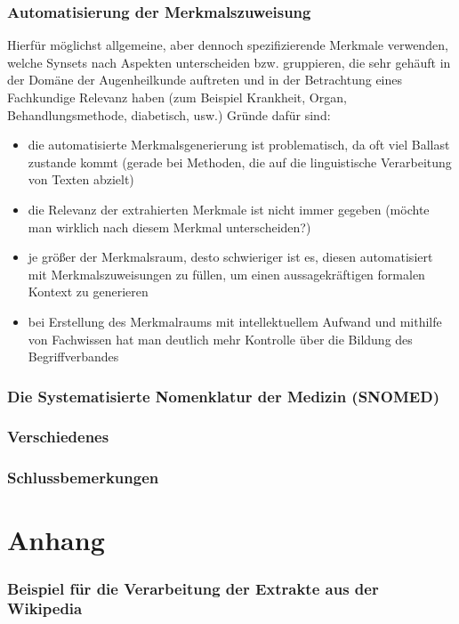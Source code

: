 \documentclass[pagesize,DIV=calc,12pt,draft]{scrreprt}
\begin{document}
\subsection{Automatisierung der Merkmalszuweisung}
Hierfür möglichst allgemeine, aber dennoch spezifizierende Merkmale verwenden, welche Synsets nach Aspekten unterscheiden bzw. gruppieren, die sehr gehäuft in der Domäne der Augenheilkunde auftreten und in der Betrachtung eines Fachkundige Relevanz haben (zum Beispiel Krankheit, Organ, Behandlungsmethode, diabetisch, usw.) 
Gründe dafür sind:
\begin{itemize}
\item die automatisierte Merkmalsgenerierung ist problematisch, da oft viel Ballast zustande kommt (gerade bei Methoden, die auf die linguistische Verarbeitung von Texten abzielt)
\item die Relevanz der extrahierten Merkmale ist nicht immer gegeben (möchte man wirklich nach diesem Merkmal unterscheiden?)
\item je größer der Merkmalsraum, desto schwieriger ist es, diesen automatisiert mit Merkmalszuweisungen zu füllen, um einen aussagekräftigen formalen Kontext zu generieren
\item bei Erstellung des Merkmalraums mit intellektuellem Aufwand und mithilfe von Fachwissen hat man deutlich mehr Kontrolle über die Bildung des Begriffverbandes
\end{itemize}

\subsection{Die Systematisierte Nomenklatur der Medizin (SNOMED)}

\subsection{Verschiedenes}

\subsection{Schlussbemerkungen}

\chapter{Anhang}

\subsection{Beispiel für die Verarbeitung der Extrakte aus der Wikipedia}
\end{document}
